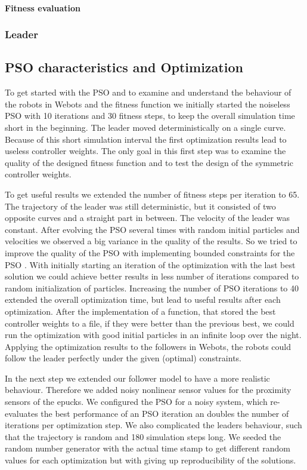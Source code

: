 \documentclass[a4, 10 pt, conference]{ieeeconf}  %
\begin{document}
\paragraph{Fitness evaluation}

\subsubsection{Leader}

\subsection{PSO characteristics and Optimization}

To get started with the PSO and to examine and understand the behaviour of the robots in Webots and the fitness function we initially started the  noiseless PSO with 10 iterations and 30 fitness steps, to keep the overall simulation time short in the beginning. The leader moved deterministically on a single curve.  Because of this short simulation interval the first optimization results lead to useless controller weights. The only goal in this first step was to examine the quality of the designed fitness function and to test the design of the symmetric controller weights.

To get useful results we extended the number of fitness steps per iteration to 65. The trajectory of the leader was still deterministic, but it consisted of two opposite curves and a straight part in between. The velocity of the leader was constant. After evolving the PSO several times with random initial particles and velocities we observed a big variance in the quality of the results. So we tried to improve the quality of the PSO with implementing bounded constraints for the PSO \cite{c1}. With initially starting an iteration of the optimization with the last best solution we could achieve better results in less number of iterations compared to random initialization of particles. Increasing the number of PSO iterations to 40 extended the overall optimization time, but lead to useful results after each optimization. After the implementation of a function, that stored the best controller weights to a file, if they were better than the previous best, we could run the optimization with good initial particles in an infinite loop over the night. Applying the optimization results to the followers in Webots, the robots could follow the leader perfectly under the given (optimal) constraints.

In the next step we extended our follower model to have a more realistic behaviour. Therefore we added noisy nonlinear sensor values for the proximity sensors of the epucks. We configured the PSO for a noisy system, which re-evaluates the best performance of an PSO iteration an doubles the number of iterations per optimization step. We also complicated the leaders behaviour, such that the trajectory is random and 180 simulation steps long. We seeded the random number generator with the actual time stamp to get different random values for each optimization but with giving up reproducibility of the solutions.
\end{document}
